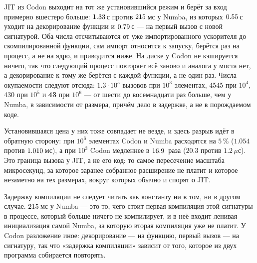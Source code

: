 JIT из Codon выходит на тот же установившийся режим и берёт за вход примерно вшестеро больше:
$\meas{fact:b1_breakeven-314:facts.codon_cost_s.compile_s}{1.33}$\,с против $\meas{fact:b1_breakeven-314:facts.numba_compile_s:ms}{215}$\,мс у Numba, из которых $\meas{fact:b1_breakeven-314:facts.codon_cost_s.decorate_s}{0.55}$\,с уходит на декорирование функции и
$\meas{fact:b1_breakeven-314:facts.codon_cost_s.first_call_s}{0.79}$\,с --- на первый вызов с новой сигнатурой. Оба числа отсчитываются от уже импортированного
ускорителя до скомпилированной функции, сам импорт относится к запуску, берётся раз на процесс, а
не на ядро, и приводится ниже. На диске у Codon не кэшируется ничего, так что следующий процесс
повторяет всё заново и аналога  у моста нет, а декорирование к тому же берётся с
каждой функции, а не один раз. Числа окупаемости следуют отсюда: \textbf{$1.3\cdot10^5$} вызовов
при $10^3$ элементах, 4545 при $10^4$, 430 при $10^5$ и \textbf{43} при $10^6$ --- от шести до
восемнадцати раз больше, чем у Numba, в зависимости от размера, причём дело в задержке, а не в
порождаемом коде.

Установившаяся цена у них тоже совпадает не везде, и здесь разрыв идёт в обратную сторону: при
$10^6$ элементах Codon и Numba расходятся на $5\,\%$ ($1.054$ против $\meas{med:b1_breakeven-314:arraysum_n1000000/numba:ms}{1.010}$\,мс), а при $10^3$
Codon медленнее в $\meas{ratio:b1_breakeven-314:arraysum_n1000/codon_jit|b1_breakeven-314:arraysum_n1000/numba}{16.9}$~раза ($20.3$ против $1.2\,\mu$с). Это граница вызова у JIT, а не его код:
то самое пересечение масштаба микросекунд, за которое заранее собранное расширение не платит и
которое незаметно на тех размерах, вокруг которых обычно и спорят о JIT.

Задержку компиляции не следует читать как константу ни в том, ни в другом случае. $\meas{fact:b1_breakeven-314:facts.numba_compile_s:ms}{215}$\,мс у
Numba --- это то, чего стоит первая компиляция  этой сигнатуры в процессе, который
больше ничего не компилирует, и в неё входит ленивая инициализация самой Numba, за которую вторая
компиляция уже не платит. У Codon разложение иное: декорирование --- на функцию, первый вызов ---
на сигнатуру, так что «задержка компиляции» зависит от того, которое из двух программа собирается
повторять.

